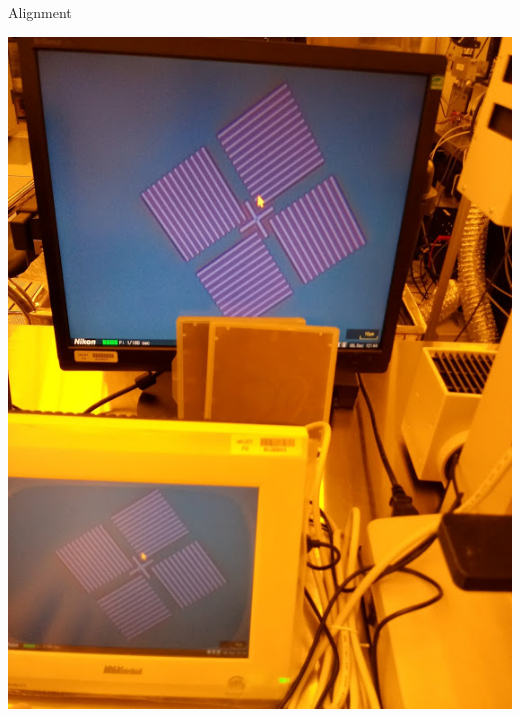 \documentclass[aspectratio=169]{beamer}
\begin{document}
\begin{frame}{Alignment}
\begin{center}
\includegraphics[height=0.8\textheight]{images/20181211_161801_Burst01.jpg}
\end{center}
\end{frame}
\end{document}
